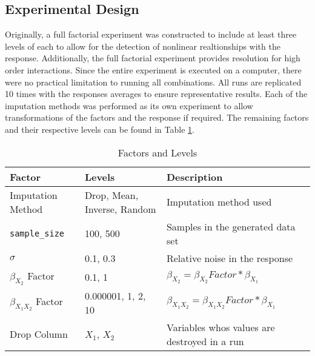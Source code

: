 \documentclass[../../paper.tex]{subfiles}
\begin{document}
\subsection{Experimental Design}
Originally, a full factorial experiment was constructed to include at least three levels of each to allow for the detection of nonlinear realtionships with the response.
Additionally, the full factorial experiment provides resolution for high order interactions. Since the entire experiment is executed on a computer, there were no practical limitation to running all combinations.
All runs are replicated 10 times with the responses averages to ensure representative results.
Each of the imputation methods was performed as its own experiment to allow transformations of the factors and the response if required. The remaining factors and their respective levels can be found in Table \ref{table:factors_and_levels}.


\begin{table}[H]
\begin{center}\label{table:factors_and_levels}
    \begin{tabular}{  l | p{1.9in} | l   }

      \rule{0pt}{14pt} \textbf{Factor} & \textbf{Levels} & \textbf{Description} \\ \hline
      \rule{0pt}{14pt} Imputation Method & Drop, Mean, Inverse, Random & Imputation method used \\ %
      \rule{0pt}{14pt} \texttt{sample_size} & 100, 500 &  Samples in the generated data set \\ %
      \rule{0pt}{14pt} $\sigma$ & 0.1, 0.3 &  Relative noise in the response \\ %
      \rule{0pt}{14pt} $\beta_{X_{2}}$ Factor & 0.1, 1 &  $\beta_{X_{2}} = \beta_{X_{2}} Factor * \beta_{X_{1}}$ \\ %
      \rule{0pt}{14pt} $\beta_{X_{1}X_{2}}$ Factor & 0.000001, 1, 2, 10 &  $\beta_{X_{1}X_{2}} = \beta_{X_{1}X_{2}} Factor * \beta_{X_{1}}$ \\ %
      \rule{0pt}{14pt} Drop Column & $X_{1}$, $X_{2}$ & Variables whos values are destroyed in a run \\ %
    \end{tabular}
    \caption{Factors and Levels}\label{table:factors_and_levels}
\end{center}
\end{table}
\end{document}
